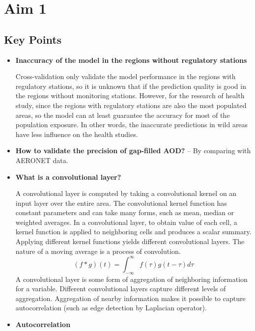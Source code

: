 \documentclass{article}
\begin{document}
\section{Aim 1}
\subsection{Key Points}
\begin{itemize}
    \item \textbf{Inaccuracy of the model in the regions without regulatory stations}{
    
    Cross-validation only validate the model performance in the regions with regulatory stations, so it is unknown that if the prediction quality is good in the regions without monitoring stations. However, for the research of health study, since the regions with regulatory stations are also the most populated areas, so the model can at least guarantee the accuracy for most of the population exposure. In other words, the inaccurate predictions in wild areas have less influence on the health studies. 
    }
    \item \textbf{How to validate the precision of gap-filled AOD?} -- By comparing with AERONET data.
    \item \textbf{What is a convolutional layer?} {
    
    A convolutional layer is computed by taking a convolutional kernel on an input layer over the entire area. The convolutional kernel function has constant parameters and can take many forms, such as mean, median or weighted averages. In a convolutional layer, to obtain value of each cell, a kernel function is applied to neighboring cells and produces a scalar summary. Applying different kernel functions yields different convolutional layers. The nature of a moving average is a process of convolution. 
    \begin{equation*}
        (f*g)(t)=\int_{-\infty}^{\infty}f(\tau)g(t-\tau)d\tau
    \end{equation*}
    A convolutional layer is some form of aggregation of neighboring information for a variable. Different convolutional layers capture different levels of aggregation. Aggregation of nearby information makes it possible to capture autocorrelation (such as edge detection by Laplacian operator). 
    }
    \item \textbf{Autocorrelation} {
    
}
\end{itemize}
\end{document}
